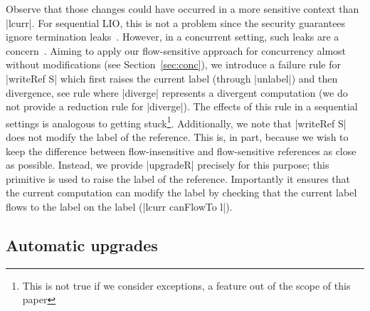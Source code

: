 Observe that those changes could have occurred in a more sensitive context than
|lcurr|. For sequential LIO, this is not a problem since the security guarantees
ignore termination leaks~\cite{stefan:lio}. However, in a concurrent setting,
such leaks are a concern~\cite{stefan:addressing-covert}. Aiming to apply our
flow-sensitive approach for concurrency almost without modifications (see
Section~\ref{sec:conc}), we introduce a failure rule for |writeRef S|
which
first raises the current label (through |unlabel|) and then
divergence, see rule 
 where |diverge| represents a divergent computation
 (we do not provide a reduction rule for |diverge|).
%
The effects of this rule in a sequential settings is analogous to getting
stuck\footnote{This is not true if we consider exceptions, a feature 
out of the scope of this paper}. 
Additionally, we note that |writeRef S| does not modify the label of the reference.
%
This is, in part, because we wish to keep the difference between
flow-insensitive and flow-sensitive references as close as possible.
%
Instead, we provide |upgradeR| precisely for this purpose; this primitive is
used to raise the label of the reference.
%
Importantly it ensures that the current computation can modify the label by
checking that the current label flows to the label on the label (|lcurr
canFlowTo l|).




\subsection{Automatic upgrades}
\label{sec:flow-sensitive:auto}

